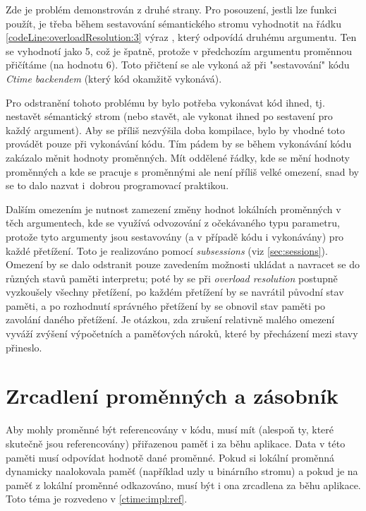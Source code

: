 Zde je problém demonstrován z druhé strany. Pro posouzení, jestli lze funkci  použít, je třeba během sestavování sémantického stromu vyhodnotit na řádku \ref{codeLine:overloadResolution:3} výraz , který odpovídá druhému argumentu. Ten se vyhodnotí jako 5, což je špatně, protože v předchozím argumentu proměnnou  přičítáme (na hodnotu 6). Toto přičtení se ale vykoná až při "sestavování" kódu \textit{Ctime backendem} (který kód okamžitě vykonává).

Pro odstranění tohoto problému by bylo potřeba vykonávat kód ihned, tj. nestavět sémantický strom (nebo stavět, ale vykonat ihned po sestavení pro každý argument). Aby se příliš nezvýšila doba kompilace, bylo by vhodné toto provádět pouze při vykonávání \ctime kódu. Tím pádem by se během vykonávání \nonctime kódu zakázalo měnit hodnoty \ctime proměnných. Mít oddělené řádky, kde se mění hodnoty \ctime proměnných a kde se pracuje s \nonctime proměnnými ale není příliš velké omezení, snad by se to dalo nazvat i~dobrou programovací praktikou.

Dalším omezením je nutnost zamezení změny hodnot lokálních proměnných v těch argumentech, kde se využívá odvozování z očekávaného typu parametru, protože tyto argumenty jsou sestavovány (a v případě \ctime kódu i vykonávány) pro každé přetížení. Toto je realizováno pomocí \textit{subsessions} (viz \ref{sec:sessions}). Omezení by se dalo odstranit pouze zavedením možnosti ukládat a navracet se do různých stavů paměti interpretu; poté by se při \textit{overload resolution} postupně vyzkoušely všechny přetížení, po každém přetížení by se navrátil původní stav paměti, a po rozhodnutí správného přetížení by se obnovil stav paměti po zavolání daného přetížení. Je otázkou, zda zrušení relativně malého omezení vyváží zvýšení výpočetních a paměťových nároků, které by přecházení mezi stavy přineslo.

\section{Zrcadlení \ctime proměnných a \ctime zásobník}
Aby mohly \ctime proměnné být referencovány v \nonctime kódu, musí mít (alespoň ty, které skutečně jsou referencovány) přiřazenou paměť i za běhu aplikace. Data v této paměti musí odpovídat hodnotě dané \ctime proměnné. Pokud si lokální \ctime proměnná dynamicky naalokovala paměť (například uzly u binárního stromu) a pokud je na paměť z lokální proměnné odkazováno, musí být i ona zrcadlena za běhu aplikace. Toto téma je rozvedeno v \ref{ctime:impl:ref}.

